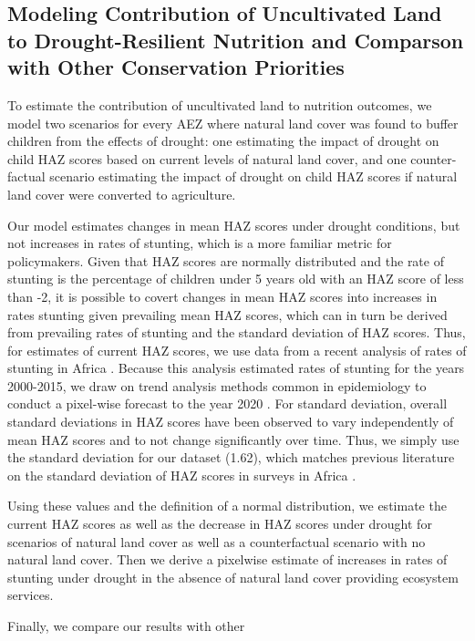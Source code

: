 \documentclass{article}
\begin{document}
\subsection{Modeling Contribution of Uncultivated Land to Drought-Resilient Nutrition and Comparson with Other Conservation Priorities}
To estimate the contribution of uncultivated land to nutrition outcomes, we model two scenarios for every AEZ where natural land cover was found to buffer children from the effects of drought: one estimating the impact of drought on child HAZ scores based on current levels of natural land cover, and one counter-factual scenario estimating the impact of drought on child HAZ scores if natural land cover were converted to agriculture.

Our model estimates changes in mean HAZ scores under drought conditions, but not increases in rates of stunting, which is a more familiar metric for policymakers. Given that HAZ scores are normally distributed and the rate of stunting is the percentage of children under 5 years old with an HAZ score of less than -2, it is possible to covert changes in mean HAZ scores into increases in rates stunting given prevailing mean HAZ scores, which can in turn be derived from prevailing rates of stunting and the standard deviation of HAZ scores.  Thus, for estimates of current HAZ scores, we use data from a recent analysis of rates of stunting in Africa \cite{Osgood-Zimmerman2018}.  Because this analysis estimated rates of stunting for the years 2000-2015, we draw on trend analysis methods common in epidemiology to conduct a pixel-wise forecast to the year 2020 \cite{Fullman2017, Osgood-Zimmerman2018}.  For standard deviation, overall standard deviations in HAZ scores have been observed to vary independently of mean HAZ scores \cite{Mei2007} and to not change significantly over time.  Thus, we simply use the standard deviation for our dataset (1.62), which matches previous literature on the standard deviation of HAZ scores in surveys in Africa \cite{Mei2007}.

Using these values and the definition of a normal distribution, we estimate the current HAZ scores as well as the decrease in HAZ scores under drought for scenarios of natural land cover as well as a counterfactual scenario with no natural land cover.  Then we derive a pixelwise estimate of increases in rates of stunting under drought in the absence of natural land cover providing ecosystem services.

Finally, we compare our results with other 
\end{document}
